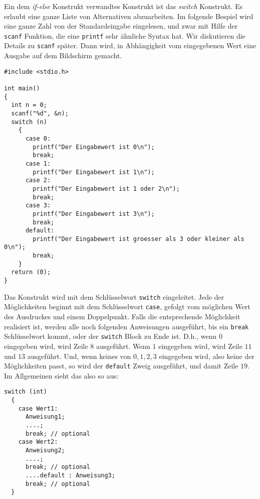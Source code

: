 Ein dem \emph{if-else} Konstrukt verwandtes Konstrukt ist das \emph{switch} Konstrukt.
Es erlaubt eine ganze Liste von Alternativen abzuarbeiten.
Im folgende Bespiel wird eine ganze Zahl von der Standardeingabe eingelesen, und zwar mit Hilfe der \verb|scanf| Funktion, die eine \verb|printf| sehr ähnliche Syntax hat.
Wir diskutieren die Details zu \verb|scanf| später.
Dann wird, in Abhängigkeit vom eingegebenen Wert eine Ausgabe auf dem Bildschirm gemacht.
\begin{lstlisting}
#include <stdio.h>

int main()
{
  int n = 0;
  scanf("%d", &n);
  switch (n)
    {
      case 0:
        printf("Der Eingabewert ist 0\n");
        break;
      case 1:
        printf("Der Eingabewert ist 1\n");
      case 2:
        printf("Der Eingabewert ist 1 oder 2\n");
        break;
      case 3:
        printf("Der Eingabewert ist 3\n");
        break;
      default:
        printf("Der Eingabewert ist groesser als 3 oder kleiner als 0\n");
        break;
    }
  return (0);
}
\end{lstlisting}
Das Konstrukt wird mit dem Schlüsselwort \verb|switch| eingeleitet.
Jede der Möglichkeiten beginnt mit dem Schlüsselwort \verb|case|, gefolgt vom möglichen Wert des Ausdruckes und einem Doppelpunkt. 
Falls die entsprechende Möglichkeit realisiert ist, werden alle noch folgenden Anweisungen ausgeführt, bis ein \verb|break| Schlüsselwort kommt, oder der \verb|switch| Block zu Ende ist.
D.h., wenn $0$ eingegeben wird, wird Zeile $8$ ausgeführt.
Wenn $1$ eingegeben wird, wird Zeile $11$ und $13$ ausgeführt.
Und, wenn keines von $0,1,2,3$ eingegeben wird, also keine der Möglichkeiten passt, so wird der \verb|default| Zweig ausgeführt, und damit Zeile $19$.
Im Allgemeinen sieht das also so aus:
\begin{lstlisting}
switch (int)
  {
    case Wert1:
      Anweisung1;
      ....;
      break; // optional
    case Wert2:
      Anweisung2;
      ....;
      break; // optional
      ....default : Anweisung3;
      break; // optional
  }
\end{lstlisting}

